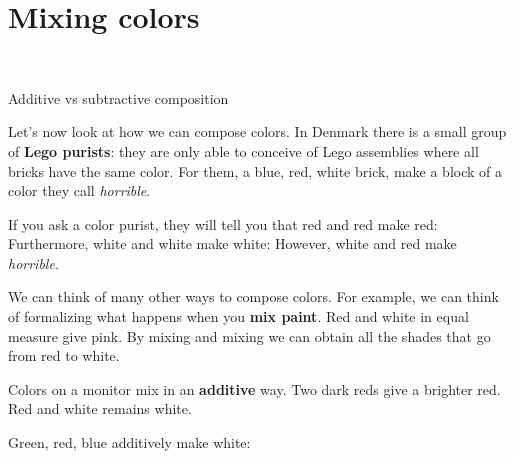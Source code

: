 

\section{Mixing colors}

\begin{marginfigure}
    \centering
    \\
    \caption{Additive vs subtractive composition}
\end{marginfigure}



Let's now look at how we can compose colors.
In Denmark there is a small group of \textbf{Lego purists}: they are only able to conceive of Lego assemblies where all bricks have the same color.
For them, a blue, red, white brick, make a block of a color they call \emph{horrible}.

If you ask a color purist, they will tell you that red and red make red:
%
%
Furthermore, white and white make white:
%
%
However, white and red make \emph{horrible}.
%



We can think of many other ways to compose colors.
For example, we can think of formalizing what happens when you \textbf{mix paint}.
Red and white in equal measure give pink.
By mixing and mixing we can obtain all the shades that go from red to white.
\begin{widepar}
    \begin{center}
    \end{center}
\end{widepar}
Colors on a monitor mix in an \textbf{additive} way. Two dark reds give a brighter red.
Red and white remains white.
\begin{widepar}
    \begin{center}
    \end{center}
\end{widepar}
Green, red, blue additively make white:

